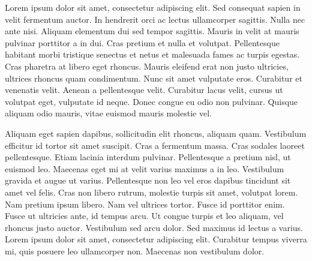 \documentclass[./main_en.tex]{subfiles}
\begin{document}
\doublespacing %
\large

\newpage
\renewcommand{\headrulewidth}{0pt}
\thispagestyle{fancy}
\fancyhf{} %
\fancyfoot{} %
\fancyfoot[C]{\thepage}

\begin{center}
    \vspace{5mm}
\end{center}
\singlespacing
\normalsize

\par Lorem ipsum dolor sit amet, consectetur adipiscing elit. Sed consequat sapien in velit fermentum auctor. In hendrerit orci ac lectus ullamcorper sagittis. Nulla nec ante nisi. Aliquam elementum dui sed tempor sagittis. Mauris in velit at mauris pulvinar porttitor a in dui. Cras pretium et nulla et volutpat. Pellentesque habitant morbi tristique senectus et netus et malesuada fames ac turpis egestas. Cras pharetra at libero eget rhoncus. Mauris eleifend erat non justo ultricies, ultrices rhoncus quam condimentum. Nunc sit amet vulputate eros. Curabitur et venenatis velit. Aenean a pellentesque velit. Curabitur lacus velit, cursus ut volutpat eget, vulputate id neque. Donec congue eu odio non pulvinar. Quisque aliquam odio mauris, vitae euismod mauris molestie vel. 

\par Aliquam eget sapien dapibus, sollicitudin elit rhoncus, aliquam quam. Vestibulum efficitur id tortor sit amet suscipit. Cras a fermentum massa. Cras sodales laoreet pellentesque. Etiam lacinia interdum pulvinar. Pellentesque a pretium nisl, ut euismod leo. Maecenas eget mi at velit varius maximus a in leo. Vestibulum gravida et augue ut varius. Pellentesque non leo vel eros dapibus tincidunt sit amet vel felis. Cras non libero rutrum, molestie turpis sit amet, volutpat lorem. Nam pretium ipsum libero. Nam vel ultrices tortor. Fusce id porttitor enim. Fusce ut ultricies ante, id tempus arcu. Ut congue turpis et leo aliquam, vel rhoncus justo auctor. Vestibulum sed arcu dolor. Sed maximus id lectus a varius. Lorem ipsum dolor sit amet, consectetur adipiscing elit. Curabitur tempus viverra mi, quis posuere leo ullamcorper non. Maecenas non vestibulum dolor. 
\end{document}
